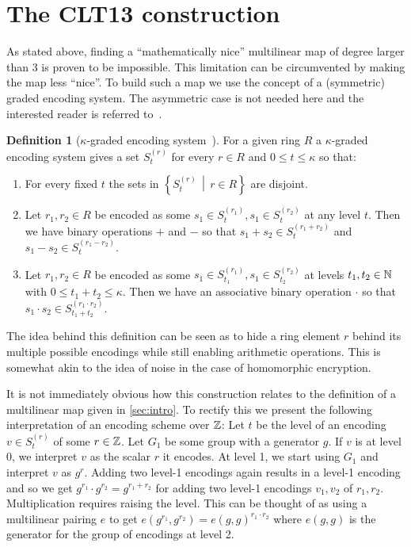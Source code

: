 \documentclass[english]{scrartcl}
\theoremstyle{plain}
\theoremstyle{definition}
\newtheorem{definition}[lemma]{Definition}
\begin{document}
    \section{The CLT13 construction}
    As stated above, finding a \enquote{mathematically nice} multilinear map of degree larger than 3 is proven to be impossible. This limitation can be circumvented by making the map less \enquote{nice}.
    To build such a map we use the concept of a (symmetric) graded encoding system. The asymmetric case is not needed here and the interested reader is referred to~\cite{cryptoeprint:mm_gentry}.
    \begin{definition}[$\kappa$-graded encoding system~\cite{cryptoeprint:2013:183}]
        For a given ring $R$ a $\kappa$-graded encoding system gives a set $S^{(r)}_t$ for every $r \in R$ and $0 \leq t \leq \kappa$ so that:
        \begin{enumerate}
            \item For every fixed $t$ the sets in $\left\lbrace S^{(r)}_t \,\middle|\, r \in R \right\rbrace$ are disjoint.
            \item Let $r_1, r_2 \in R$ be encoded as some $s_1 \in S^{(r_1)}_t, s_1 \in S^{(r_2)}_t$ at any level $t$. Then we have binary operations $+$ and $-$ so that $s_1 + s_2 \in S^{(r_1 + r_2)}_t$ and $s_1 - s_2 \in S^{(r_1 - r_2)}_t$.
            \item Let $r_1, r_2 \in R$ be encoded as some $s_1 \in S^{(r_1)}_{t_1}, s_1 \in S^{(r_2)}_{t_2}$ at levels $t_1, t_2 \in \mathbb{N}$ with $0 \leq t_1 + t_2 \leq \kappa$. Then we have an associative binary operation $\cdot$ so that $s_1 \cdot s_2 \in S^{(r_1 \cdot r_2)}_{t_1 + t_2}$.
        \end{enumerate}
    \end{definition}

    The idea behind this definition can be seen as to hide a ring element $r$ behind its multiple possible encodings while still enabling arithmetic operations. This is somewhat akin to the idea of noise in the case of homomorphic encryption.

    It is not immediately obvious how this construction relates to the definition of a multilinear map given in \cref{sec:intro}. To rectify this we present the following interpretation of an encoding scheme over $\mathbb{Z}$:
    Let $t$ be the level of an encoding $v \in S^{(r)}_t$ of some $r \in \mathbb{Z}$. Let $G_1$ be some group with a generator $g$. If $v$ is at level 0, we interpret $v$ as the scalar $r$ it encodes. At level 1, we start using $G_1$ and interpret $v$ as $g^r$. Adding two level-1 encodings again results in a level-1 encoding and so we get $g^{r_1} \cdot g^{r_2} = g^{r_1 + r_2}$ for adding two level-1 encodings $v_1, v_2$ of $r_1, r_2$.
    Multiplication requires raising the level. This can be thought of as using a multilinear pairing $e$ to get $e(g^{r_1}, g^{r_2}) = e(g, g)^{r_1 \cdot r_2}$ where $e(g,g)$ is the generator for the group of encodings at level 2.~\cite{zimmerman}
\end{document}
